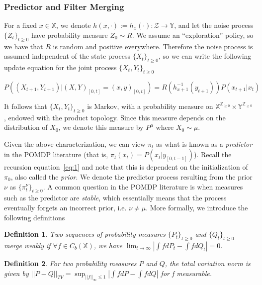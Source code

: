 \documentclass{article}
\newtheorem{definition}{Definition}[section]
\begin{document}
\subsubsection*{Predictor and Filter Merging}

For a fixed \( x \in \mathbb{X} \), we denote \( h(x,\cdot) := h_x(\cdot) : \mathcal{Z} \to \mathbb{Y} \), and let the noise process \( \{Z_t\}_{t\ge0} \) have probability measure \( Z_0 \sim R \). We assume an ``exploration'' policy, so we have that \(R\) is random and positive everywhere. Therefore the noise process is assumed independent of the state process \( \{X_t\}_{t\ge0} \), so we can write the following update equation for the joint process \( \{X_t,Y_t\}_{t\ge0} \) %

\[ P((X_{t+1},Y_{t+1}) | (X,Y)_{[0,t]} = (x,y)_{[0,t]}) = R(h_{x+1}^{-1}(y_{t+1}))P(x_{t+1} | x_t) \] %

It follows that \( \{X_t,Y_t\}_{t\ge0} \) is Markov, with a probability measure on \( \mathbb{X}^{\mathbb{Z}_{\ge0}} \times \mathbb{Y}^{\mathbb{Z}_{\ge0}} \), endowed with the product topology. Since this measure depends on the distribution of \( X_0 \), we denote this measure by \( P^\mu \) where \( X_0 \sim \mu \). %

Given the above characterization, we can view \( \pi_t \) as what is known as a \emph{predictor} in the POMDP literature (that is, \( \pi_t(x_t) = P(x_t | y_{[0,t-1]}) \)). Recall the recursion equation~\eqref{eq:1} and note that this is dependent on the initialization of \( \pi_0 \), also called the \emph{prior}. We denote the predictor process resulting from the prior \( \nu \) as \( \{\pi_t^\nu \}_{t\ge0} \). A common question in the POMDP literature is when measures such as the predictor are \emph{stable}, which essentially means that the process eventually forgets an incorrect prior, i.e. \( \nu \neq \mu \). More formally, we introduce the following definitions %

\begin{definition}\label{definition:weak_merge}
    Two sequences of probability measures \( \{P_t\}_{t\ge0} \) and \( \{Q_t\}_{t\ge0} \) merge weakly if \( \forall f \in C_b(\mathbb{X}) \), we have \( \lim_{t \to \infty} |\int fdP_t - \int fdQ_t| = 0\). %
\end{definition}

\begin{definition}\label{definition:TV_merge}
    For two probability measures \( P \) and \( Q \), the total variation norm is given by \( ||P-Q||_{TV} = \sup_{||f||_\infty \le 1} |\int fdP - \int fdQ| \) for f measurable.
\end{definition}
\end{document}

